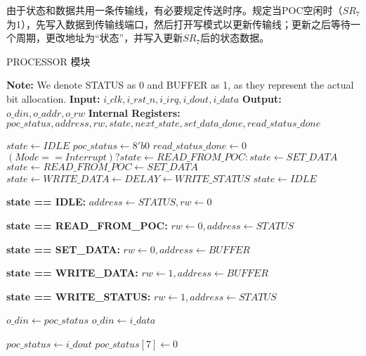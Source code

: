 \documentclass[lang=cn,a4paper,newtx]{elegantpaper}
\begin{document}
由于状态和数据共用一条传输线，有必要规定传送时序。规定当POC空闲时（$SR_7$为1），先写入数据到传输线端口，然后打开写模式以更新传输线；更新之后等待一个周期，更改地址为“状态”，并写入更新$SR_7$后的状态数据。
\begin{algorithm}[H]
    \caption{PROCESSOR 模块}
    \label{alg:PROCESSOR}
    \begin{algorithmic}[1]
    \State \textbf{Note:} We denote STATUS as 0 and BUFFER as 1, as they represent the actual bit allocation.
    \State \textbf{Input:} $i\_clk, i\_rst\_n, i\_irq, i\_dout, i\_data$
    \State \textbf{Output:} $o\_din, o\_addr, o\_rw$
    \State \textbf{Internal Registers:} $poc\_status, address, rw, state, next\_state, set\_data\_done, read\_status\_done$
    

        \State $state \gets IDLE$
        \State $poc\_status \gets 8'b0$
        \State $read\_status\_done \gets 0$
    \EndProcedure
            \State $ (Mode == Interrupt)? state \gets READ\_FROM\_POC : state \gets SET\_DATA$
        \EndIf
        \State $ state \gets READ\_FROM\_POC \gets SET\_DATA$
        \State $ state \gets WRITE\_DATA \gets DELAY \gets WRITE\_STATUS $
        \State $ state \gets IDLE$
    \EndProcedure

        \State \textbf{state == IDLE: } $address \gets STATUS, rw \gets 0$

        \State \textbf{state == READ\_FROM\_POC: } $rw \gets 0, address \gets STATUS$

        \State \textbf{state == SET\_DATA: }$rw \gets 0, address \gets BUFFER$

        \State \textbf{state == WRITE\_DATA: } $rw \gets 1, address \gets BUFFER$

        \State \textbf{state == WRITE\_STATUS: }$rw \gets 1, address \gets STATUS$

    \EndProcedure
    
            \State $o\_din \gets poc\_status$
        \Else
            \State $o\_din \gets i\_data$
        \EndIf
    \EndProcedure
    
            \State $poc\_status \gets i\_dout$
            \State $poc\_status[7] \gets 0$
        \EndIf

    \EndProcedure
    \end{algorithmic}
\end{algorithm}
\end{document}
